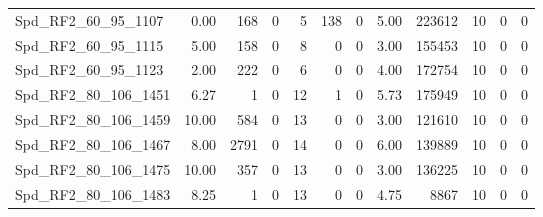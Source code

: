 \begin{longtable}[c]{@{}lrrrrrrrrrrr@{}}
Spd\_RF2\_60\_95\_1107       & 0.00                   & 168                     & 0                       & 5                      & 138                     & 0                       & 5.00                    & 223612                   & 10                       & 0                        & 0                        \\
Spd\_RF2\_60\_95\_1115       & 5.00                   & 158                     & 0                       & 8                      & 0                       & 0                       & 3.00                    & 155453                   & 10                       & 0                        & 0                        \\
Spd\_RF2\_60\_95\_1123       & 2.00                   & 222                     & 0                       & 6                      & 0                       & 0                       & 4.00                    & 172754                   & 10                       & 0                        & 0                        \\
Spd\_RF2\_80\_106\_1451      & 6.27                   & 1                       & 0                       & 12                     & 1                       & 0                       & 5.73                    & 175949                   & 10                       & 0                        & 0                        \\
Spd\_RF2\_80\_106\_1459      & 10.00                  & 584                     & 0                       & 13                     & 0                       & 0                       & 3.00                    & 121610                   & 10                       & 0                        & 0                        \\
Spd\_RF2\_80\_106\_1467      & 8.00                   & 2791                    & 0                       & 14                     & 0                       & 0                       & 6.00                    & 139889                   & 10                       & 0                        & 0                        \\
Spd\_RF2\_80\_106\_1475      & 10.00                  & 357                     & 0                       & 13                     & 0                       & 0                       & 3.00                    & 136225                   & 10                       & 0                        & 0                        \\
Spd\_RF2\_80\_106\_1483      & 8.25                   & 1                       & 0                       & 13                     & 0                       & 0                       & 4.75                    & 8867                     & 10                       & 0                        & 0                        \\

\end{longtable}
